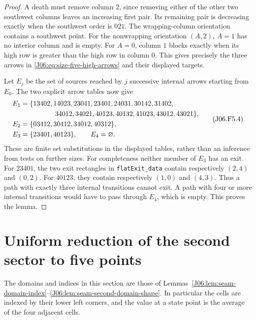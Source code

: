 \documentclass[11pt,oneside]{report}
\theoremstyle{definition}
\numberwithin{equation}{section}
\newcommand{\decl}[1]{\textnormal{\nolinkurl{#1}}}
\begin{document}
\begin{proof}
A death must remove column $2$, since removing either of the other
two southwest columns leaves an increasing first pair.
Its remaining pair is decreasing exactly when the southwest order
is $021$. The wrapping-column orientation contains a southwest point.
For the nonwrapping orientation $(A,2)$, $A=1$ has no interior
column and is empty. For $A=0$, column $1$ blocks exactly when its
high row is greater than the high row in column $0$.
This gives precisely the three arrows in
\eqref{J06:eq:size-five-high-arrows} and their displayed targets.

Let $E_j$ be the set of sources reached by $j$ successive internal
arrows starting from $E_0$. The two explicit arrow tables now give
\[
\begin{split}
E_1={}&\{13402,14023,23041,23401,24031,30142,31402,\\
      &\hspace{13mm}34012,34021,40123,40132,41023,43012,43021\},\\
E_2={}&\{03412,30412,34012,40312\},\\
E_3={}&\{23401,40123\},\qquad E_4=\varnothing.
\end{split}
\tag{J06.F5.4}\label{J06:eq:size-five-reachability}
\]
These are finite set substitutions in the displayed tables, rather
than an inference from tests on further sizes.
For completeness neither member of $E_3$ has an exit.
For $23401$, the two exit rectangles in \decl{flatExit_data} contain
respectively $(2,4)$ and $(0,2)$.
For $40123$, they contain respectively $(1,0)$ and $(4,3)$.
Thus a path with exactly three internal transitions cannot exit.
A path with four or more internal transitions would have to pass
through $E_4$, which is empty. This proves the lemma.
\end{proof}

\section{Uniform reduction of the second sector to five points}

The domains and indices in this section are those of
Lemmas~\ref{J06:lem:seam-domain-index}--\ref{J06:lem:seam-second-domain-shape}.
In particular the cells are indexed by their lower left corners, and
the value at a state point is the average of the four adjacent cells.
\end{document}
